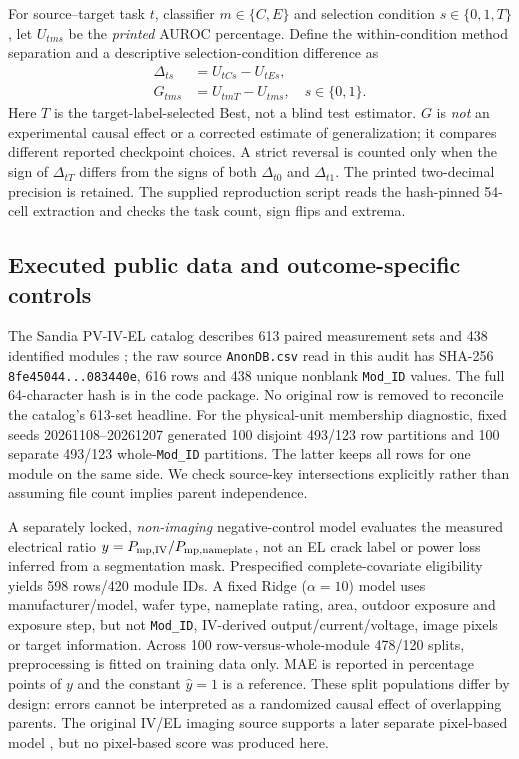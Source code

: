 \documentclass[10pt,a4paper]{article}
\begin{document}
For source--target task $t$, classifier $m\in\{C,E\}$ and selection condition $s\in\{0,1,T\}$, let $U_{tms}$ be the \emph{printed} AUROC percentage. Define the within-condition method separation and a descriptive selection-condition difference as
\begin{align}
\Delta_{ts}&=U_{tCs}-U_{tEs},\\
G_{tms}&=U_{tmT}-U_{tms},\quad s\in\{0,1\}.
\end{align}
Here $T$ is the target-label-selected Best, not a blind test estimator. $G$ is \emph{not} an experimental causal effect or a corrected estimate of generalization; it compares different reported checkpoint choices. A strict reversal is counted only when the sign of $\Delta_{tT}$ differs from the signs of both $\Delta_{t0}$ and $\Delta_{t1}$. The printed two-decimal precision is retained. The supplied reproduction script reads the hash-pinned 54-cell extraction and checks the task count, sign flips and extrema.

\subsection{Executed public data and outcome-specific controls}
The Sandia PV-IV-EL catalog describes 613 paired measurement sets and 438 identified modules \cite{sandia2025}; the raw source \texttt{AnonDB.csv} read in this audit has SHA-256 \texttt{8fe45044...083440e}, 616 rows and 438 unique nonblank \texttt{Mod\_ID} values. The full 64-character hash is in the code package. No original row is removed to reconcile the catalog's 613-set headline. For the physical-unit membership diagnostic, fixed seeds 20261108--20261207 generated 100 disjoint 493/123 row partitions and 100 separate 493/123 whole-\texttt{Mod\_ID} partitions. The latter keeps all rows for one module on the same side. We check source-key intersections explicitly rather than assuming file count implies parent independence.

A separately locked, \emph{non-imaging} negative-control model evaluates the measured electrical ratio $y=P_{\rm mp,IV}/P_{\rm mp,nameplate}$, not an EL crack label or power loss inferred from a segmentation mask. Prespecified complete-covariate eligibility yields 598 rows/420 module IDs. A fixed Ridge ($\alpha=10$) model uses manufacturer/model, wafer type, nameplate rating, area, outdoor exposure and exposure step, but not \texttt{Mod\_ID}, IV-derived output/current/voltage, image pixels or target information. Across 100 row-versus-whole-module 478/120 splits, preprocessing is fitted on training data only. MAE is reported in percentage points of $y$ and the constant $\hat y=1$ is a reference. These split populations differ by design: errors cannot be interpreted as a randomized causal effect of overlapping parents. The original IV/EL imaging source supports a later separate pixel-based model \cite{byford2025}, but no pixel-based score was produced here.
\end{document}
